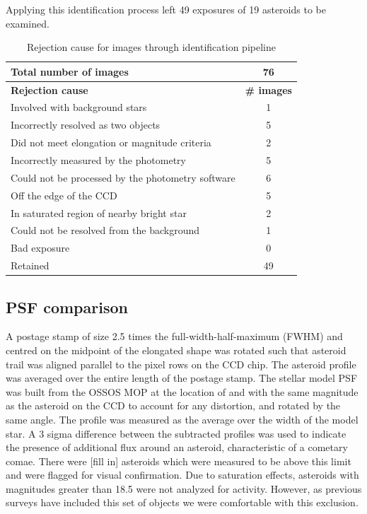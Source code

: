 \documentclass[iop,apj]{emulateapj}
\begin{document}
Applying this identification process left 49 exposures of 19 asteroids to be examined.

\begin{table}[htdp]
\caption{Rejection cause for images through identification pipeline}
\begin{center}
\begin{tabular}{lc}
	Total number of images						&	76 \\
	\hline
	\textbf{Rejection cause}						& 	\textbf{\# images} \\
	\hline
	Involved with background stars                                     	& 	1			\\
	Incorrectly resolved as two objects				& 	5			\\
	Did not meet elongation or magnitude criteria		& 	2			\\
	Incorrectly measured by the photometry			& 	5			\\
	Could not be processed by the photometry software	& 	6			\\
	Off the edge of the CCD						& 	5			\\
	In saturated region of nearby bright star			& 	2			\\
	Could not be resolved from the background 			&	1			\\
	Bad exposure								&	0	\\
	\hline
	Retained									& 	49       
\end{tabular}
\end{center}
\label{default}
\end{table}

\subsection{PSF comparison}

A postage stamp of size 2.5 times the full-width-half-maximum (FWHM) and centred on the midpoint of the elongated shape was rotated such that asteroid trail was aligned parallel to the pixel rows on the CCD chip. The asteroid profile was averaged over the entire length of the postage stamp. The stellar model PSF was built from the OSSOS MOP at the location of and with the same magnitude as the asteroid on the CCD to account for any distortion, and rotated by the same angle.  The profile was measured as the average over the width of the model star. A 3 sigma difference between the subtracted profiles was used to indicate the presence of additional flux around an asteroid, characteristic of a cometary comae. There were [fill in] asteroids which were measured to be above this limit and were flagged for visual confirmation. Due to saturation effects, asteroids with magnitudes greater than 18.5 were not analyzed for activity. However, as previous surveys have included this set of objects \citep{hsieh15} we were comfortable with this exclusion.
\end{document}
